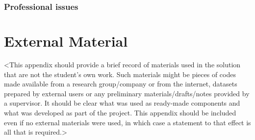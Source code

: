 \begin{appendices}
\subsection{Professional issues}


%
%
\chapter{External Material}
<This appendix should provide a brief record of materials used in the solution that are not the student's own work. Such materials might be pieces of codes made available from a research group/company or from the internet, datasets prepared by external users or any preliminary materials/drafts/notes provided by a supervisor. It should be clear what was used as ready-made components and what was developed as part of the project. This appendix should be included even if no external materials were used, in which case a statement to that effect is all that is required.>




%
%



\end{appendices}
